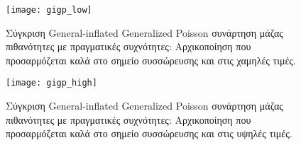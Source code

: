 \begin{figure}[!htb]
	\begin{minipage}{0.48\textwidth}
		\texttt{[image: gigp\_low]}
		\caption{Σύγκριση General-inflated Generalized Poisson συνάρτηση μάζας πιθανότητες με πραγματικές συχνότητες: Αρχικοποίηση που προσαρμόζεται καλά στο σημείο συσσώρευσης και στις χαμηλές τιμές.}	
		\label{fig:low}
	\end{minipage}
	\begin{minipage}{0.48\textwidth}
		\texttt{[image: gigp\_high]}
		\caption{Σύγκριση General-inflated Generalized Poisson συνάρτηση μάζας πιθανότητες με πραγματικές συχνότητες: Αρχικοποίηση που προσαρμόζεται καλά στο σημείο συσσώρευσης και στις υψηλές τιμές.}	
		\label{fig:high}
	\end{minipage}
\end{figure}
\FloatBarrier
